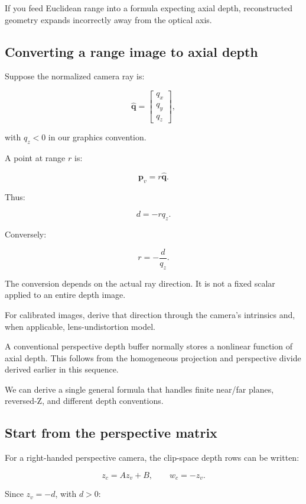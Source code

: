 If you feed Euclidean range into a formula expecting axial depth, reconstructed geometry expands incorrectly away from the optical axis.

\subsection{Converting a range image to axial depth}\label{02-foundations-ii-ch035-converting-a-range-image-to-axial-depth}

Suppose the normalized camera ray is:

\[ \hat{\mathbf q}= \begin{bmatrix}q_x\\q_y\\q_z\end{bmatrix}, \]

with \(q_z<0\) in our graphics convention.

A point at range \(r\) is:

\[ \mathbf p_v=r\hat{\mathbf q}. \]

Thus:

\[ \boxed{d=-rq_z}. \]

Conversely:

\[ \boxed{r=-\frac d{q_z}}. \]

The conversion depends on the actual ray direction. It is not a fixed scalar applied to an entire depth image.

For calibrated images, derive that direction through the camera's intrinsics and, when applicable, lens-undistortion model.

A conventional perspective depth buffer normally stores a nonlinear function of axial depth. This follows from the homogeneous projection and perspective divide derived earlier in this sequence.

We can derive a single general formula that handles finite near/far planes, reversed-Z, and different depth conventions.

\subsection{Start from the perspective matrix}\label{02-foundations-ii-ch035-start-from-the-perspective-matrix}

For a right-handed perspective camera, the clip-space depth rows can be written:

\[ z_c=Az_v+B, \qquad w_c=-z_v. \]

Since \(z_v=-d\), with \(d>0\):

